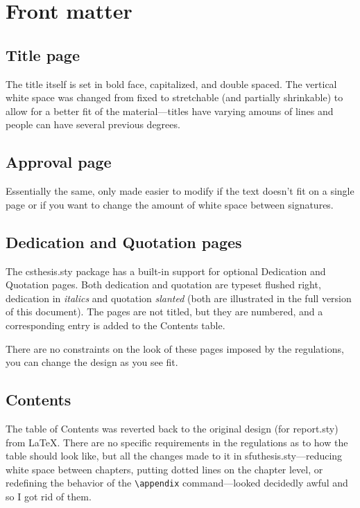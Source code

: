 \section{Front matter}

\subsection{Title page}

The title itself is set in bold face, capitalized, and double
spaced. The vertical white space was changed from fixed to stretchable
(and partially shrinkable) to allow for a better fit of the
material---titles have varying amouns of lines and people can have
several previous degrees.

\subsection{Approval page} 

Essentially the same, only made easier to modify if the text doesn't
fit on a single page or if you want to change the amount of white
space between signatures.

\subsection{Dedication and Quotation pages}

The \textsf{csthesis.sty}
package has a built-in support for optional Dedication and Quotation
pages. Both dedication and
quotation are typeset flushed right, dedication in
\textit{italics} and quotation \textsl{slanted} (both are illustrated
in the full version of this document). The pages are not titled, but
they are numbered, and a corresponding entry is added to the Contents
table.

There are no constraints on the look of these pages imposed by the
regulations, you can change the design as
you see fit.

\subsection{Contents}
\label{cont}

The table of Contents was reverted back to the original design (for
\textsf{report.sty}) from \LaTeX. There are no specific requirements
in the regulations as to how the table
should look like, but all the changes made to it in
\textsf{sfuthesis.sty}---reducing
white space between chapters, putting dotted lines on the chapter
level, or redefining the behavior of the \verb+\appendix+%
command---looked decidedly awful and so I got rid of them.


